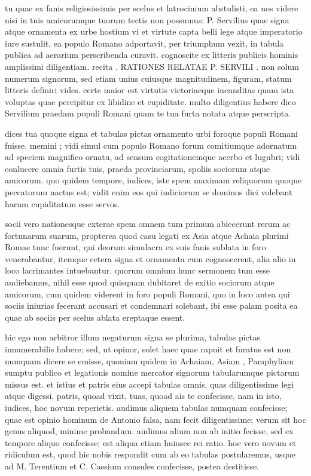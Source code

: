  tu quae ex fanis religiosissimis per scelus et latrocinium abstulisti, ea nos videre nisi in tuis amicorumque tuorum tectis non possumus: P. Servilius quae signa atque ornamenta ex urbe hostium vi et virtute capta belli lege atque imperatorio iure sustulit, ea populo Romano adportavit, per triumphum vexit, in tabula publica ad aerarium perscribenda curavit. cognoscite ex litteris publicis hominis amplissimi diligentiam. recita . RATIONES RELATAE P. SERVILI . non solum numerum signorum, sed etiam unius cuiusque magnitudinem, figuram, statum litteris definiri vides. certe maior est virtutis victoriaeque iucunditas quam ista voluptas quae percipitur ex libidine et cupiditate. multo diligentius habere dico Servilium praedam populi Romani quam te tua furta notata atque perscripta.

 dices tua quoque signa et tabulas pictas ornamento urbi foroque populi Romani fuisse. memini ; vidi simul cum populo Romano forum comitiumque adornatum ad speciem magnifico ornatu, ad sensum cogitationemque acerbo et lugubri; vidi conlucere omnia furtis tuis, praeda provinciarum, spoliis sociorum atque amicorum. quo quidem tempore, iudices, iste spem maximam reliquorum quoque peccatorum nactus est; vidit enim eos qui iudiciorum se dominos dici volebant harum cupiditatum esse servos.

 socii vero nationesque exterae spem omnem tum primum abiecerunt rerum ac fortunarum suarum, propterea quod casu legati ex Asia atque Achaia plurimi Romae tunc fuerunt, qui deorum simulacra ex suis fanis sublata in foro venerabantur, itemque cetera signa et ornamenta cum cognoscerent, alia alio in loco lacrimantes intuebantur. quorum omnium hunc sermonem tum esse audiebamus, nihil esse quod quisquam dubitaret de exitio sociorum atque amicorum, cum quidem viderent in foro populi Romani, quo in loco antea qui sociis iniurias fecerant accusari et condemnari solebant, ibi esse palam posita ea quae ab sociis per scelus ablata ereptaque essent.

 hic ego non arbitror illum negaturum signa se plurima, tabulas pictas innumerabilis habere; sed, ut opinor, solet haec quae rapuit et furatus est non numquam dicere se emisse, quoniam quidem in Achaiam, Asiam , Pamphyliam sumptu publico et legationis nomine mercator signorum tabularumque pictarum missus est. et istius et patris eius accepi tabulas omnis, quas diligentissime legi atque digessi, patris, quoad vixit, tuas, quoad ais te confecisse. nam in isto, iudices, hoc novum reperietis. audimus aliquem tabulas numquam confecisse; quae est opinio hominum de Antonio falsa, nam fecit diligentissime; verum sit hoc genus aliquod, minime probandum. audimus alium non ab initio fecisse, sed ex tempore aliquo confecisse; est aliqua etiam huiusce rei ratio. hoc vero novum et ridiculum est, quod hic nobis respondit cum ab eo tabulas postularemus, usque ad M. Terentium et C. Cassium consules confecisse, postea destitisse.

